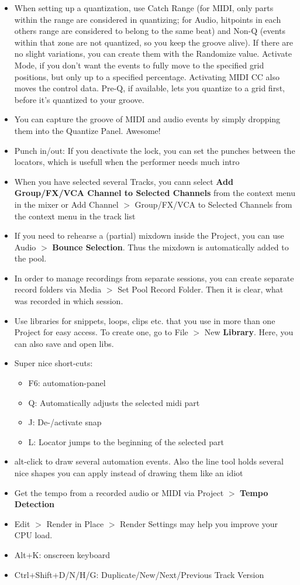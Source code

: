 \documentclass[10pt]{article}
\begin{document}
\begin{itemize}
	\item When setting up a quantization, use Catch Range (for MIDI, only parts within the range are considered in quantizing; for Audio, hitpoints in each others range are considered to belong to the same beat) and Non-Q (events within that zone are not quantized, so you keep the groove alive). If there are no slight variations, you can create them with the Randomize value. Activate Mode, if you don't want the events to fully move to the specified grid positions, but only up to a specified percentage. Activating MIDI CC also moves the control data. Pre-Q, if available, lets you quantize to a grid first, before it's quantized to your groove.
	\item You can capture the groove of MIDI and audio events by simply dropping them into the Quantize Panel. Awesome!
	\item Punch in/out: If you deactivate the lock, you can set the punches between the locators, which is usefull when the performer needs much intro
	\item When you have selected several Tracks, you cann select \textbf{Add Group/FX/VCA Channel to Selected Channels} from the context menu in the mixer or Add Channel $>$ Group/FX/VCA to Selected Channels from the context menu in the track list
	\item If you need to rehearse a (partial) mixdown inside the Project, you can use Audio $>$ \textbf{Bounce Selection}. Thus the mixdown is automatically added to the pool.
	\item In order to manage recordings from separate sessions, you can create separate record folders via Media $>$ Set Pool Record Folder. Then it is clear, what was recorded in which session.
	\item Use libraries for snippets, loops, clips etc. that you use in more than one Project for easy access. To create one, go to File $>$ New \textbf{Library}. Here, you can also save and open libs.
	\item Super nice short-cuts:
	\begin{itemize}
		\item F6: automation-panel
		\item Q: Automatically adjusts the selected midi part
		\item J: De-/activate snap
		\item L: Locator jumps to the beginning of the selected part
	\end{itemize}
	\item alt-click to draw several automation events. Also the line tool holds several nice shapes you can apply instead of drawing them like an idiot
	\item Get the tempo from a recorded audio or MIDI via Project $>$ \textbf{Tempo Detection}
	\item Edit $>$ Render in Place $>$ Render Settings may help you improve your CPU load.
	\item Alt+K: onscreen keyboard
	\item Ctrl+Shift+D/N/H/G: Duplicate/New/Next/Previous Track Version
\end{itemize}
\end{document}
